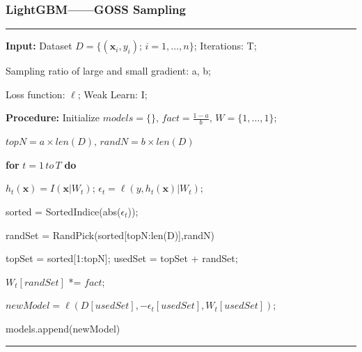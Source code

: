 \documentclass[usenames,dvipsnames]{beamer}
\begin{document}
\begin{frame}
\frametitle{LightGBM——GOSS Sampling}
\noindent\rule[0.10\baselineskip]{\textwidth}{0.75pt}
            \textbf{Input:} Dataset $D=\{(\textbf{x}_i,y_i);\, i = 1,\dots, n\}$; Iterations: T;\par
            \hspace*{12pt} Sampling ratio of large and small gradient: a, b;\par
            \hspace*{12pt} Loss function: $\ell$; Weak Learn: I;\par
            \textbf{Procedure:} Initialize $models = \{\},\,fact = \frac{1-a}{b},\, W = \{1,\dots,1\}$;\par
            \hspace*{28pt} $topN = a\times len(D),\, randN = b\times len(D)$\par
            \hspace*{28pt} \textbf{for} $t=1\, to\, T$ \textbf{do}\par
            \hspace*{44pt}  $h_t(\textbf{x}) = I(\textbf{x}|W_t)$; $\epsilon_t = \ell(y,h_t(\textbf{x})|W_t)$;\par
            \hspace*{44pt}  sorted = SortedIndice(abs($\epsilon_t$));\par
            \hspace*{44pt}  randSet = RandPick(sorted[topN:len(D)],randN)\par

            \hspace*{44pt}  topSet = sorted[1:topN]; usedSet = topSet + randSet;\par
            \hspace*{44pt}  $W_t[randSet]$ *= $fact$; \par
            \hspace*{44pt}  $newModel = \ell(D[usedSet], -\epsilon_t[usedSet],W_t[usedSet])$;\par
            \hspace*{44pt}  models.append(newModel)\par
\noindent\rule[0.10\baselineskip]{\textwidth}{0.75pt}\par
\end{frame}
\end{document}
